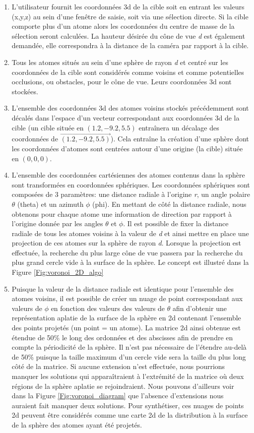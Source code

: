 \begin{enumerate}
	\item L'utilisateur fournit les coordonnées 3d de la cible soit en entrant les valeurs (x,y,z) au sein d'une fenêtre de saisie, soit via une sélection directe. Si la cible comporte plus d'un atome alors les coordonnées du centre de masse de la sélection seront calculées. La hauteur désirée du cône de vue \textit{d} est également demandée, elle correspondra à la distance de la caméra par rapport à la cible.
	\item Tous les atomes situés au sein d'une sphère de rayon \textit{d} et centré sur les coordonnées de la cible sont considérés comme voisins et comme potentielles occlusions, ou obstacles, pour le cône de vue. Leurs coordonnées 3d sont stockées.
	\item L'ensemble des coordonnées 3d des atomes voisins stockés précédemment sont décalés dans l'espace d'un vecteur correspondant aux coordonnées 3d de la cible (un cible située en $(1.2,-9.2,5.5)$ entraînera un décalage des coordonnées de $\overrightarrow{(1.2,-9.2,5.5)}$). Cela entraîne la création d'une sphère dont les coordonnées d'atomes sont centrées autour d'une origine (la cible) située en $(0,0,0)$.
	\item L'ensemble des coordonnées cartésiennes des atomes contenus dans la sphère sont transformées en coordonnées sphériques. Les coordonnées sphériques sont composées de 3 paramètres: une distance radiale à l'origine \textit{r}, un angle polaire $\theta$ (theta) et un azimuth $\phi$ (phi). En mettant de côté la distance radiale, nous obtenons pour chaque atome une information de direction par rapport à l'origine donnée par les angles $\theta$ et $\phi$. Il est possible de fixer la distance radiale de tous les atomes voisins à la valeur de \textit{d} et ainsi mettre en place une projection de ces atomes sur la sphère de rayon \textit{d}. Lorsque la projection est effectuée, la recherche du plus large cône de vue passera par la recherche du plus grand cercle vide à la surface de la sphère. Le concept est illustré dans la Figure \ref{Fig:voronoi_2D_algo}
	\item Puisque la valeur de la distance radiale est identique pour l'ensemble des atomes voisins, il est possible de créer un nuage de point correspondant aux valeurs de $\phi$ en fonction des valeurs des valeurs de $\theta$ afin d'obtenir une représentation aplatie de la surface de la sphère en 2d contenant l'ensemble des points projetés (un point = un atome). La matrice 2d ainsi obtenue est étendue de 50\% le long des ordonnées et des abscisses afin de prendre en compte la périodicité de la sphère. Il n'est pas nécessaire de l'étendre au-delà de 50\% puisque la taille maximum d'un cercle vide sera la taille du plus long côté de la matrice. Si aucune extension n'est effectuée, nous pourrions manquer les solutions qui apparaîtraient à l'extrémité de la matrice où deux régions de la sphère aplatie se rejoindraient. Nous pouvons d'ailleurs voir dans la Figure \ref{Fig:voronoi_diagram} que l'absence d'extensions nous auraient fait manquer deux solutions. Pour synthétiser, ces nuages de points 2d peuvent être considérés comme une carte 2d de la distribution à la surface de la sphère des atomes ayant été projetés.

\end{enumerate}
